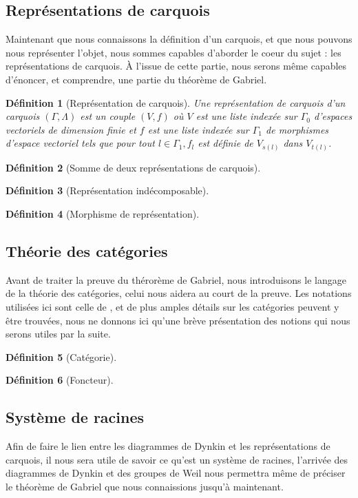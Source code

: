 \documentclass[a4paper,10pt]{article}
\newtheorem{defi}{Définition}[section]
\begin{document}
\subsection{Représentations de carquois}
Maintenant que nous connaissons la définition d'un carquois, et que nous pouvons nous représenter l'objet, nous sommes capables d'aborder le coeur du sujet : les représentations de carquois. À l'issue de cette partie, nous serons même capables d'énoncer, et comprendre, une partie du théorème de Gabriel.
\begin{defi}[Représentation de carquois]
  Une représentation de carquois d'un carquois $(\Gamma,\Lambda)$ est un couple $(V,f)$ où $V$ est une liste indexée sur $\Gamma_0$ d'espaces vectoriels de dimension finie et $f$ est une liste indexée sur $\Gamma_1$ de morphismes d'espace vectoriel tels que pour tout $l \in \Gamma_1, f_l$ est définie de $V_{s(l)}$ dans $V_{t(l)}$.
\end{defi}
\begin{defi}[Somme de deux représentations de carquois]
\end{defi}
\begin{defi}[Représentation indécomposable]
\end{defi}
\begin{defi}[Morphisme de représentation]
\end{defi}
\subsection{Théorie des catégories}
Avant de traiter la preuve du thérorème de Gabriel, nous introduisons le langage de la théorie des catégories, celui nous aidera au court de la preuve. Les notations utilisées ici sont celle de \cite{A97}, et de plus amples détails sur les catégories peuvent y être trouvées, nous ne donnons ici qu'une brève présentation des notions qui nous serons utiles par la suite.
\begin{defi}[Catégorie]
\end{defi}
\begin{defi}[Foncteur]
\end{defi}
\subsection{Système de racines}
Afin de faire le lien entre les diagrammes de Dynkin et les représentations de carquois, il nous sera utile de savoir ce qu'est un système de racines, l'arrivée des diagrammes de Dynkin et des groupes de Weil nous permettra même de préciser le théorème de Gabriel que nous connaissions jusqu'à maintenant.
\end{document}
